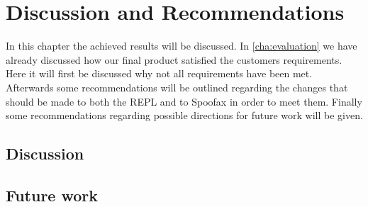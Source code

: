 \chapter{Discussion and Recommendations}
\label{cha:disc-recomm}

In this chapter the achieved results will be discussed. In \cref{cha:evaluation}
we have already discussed how our final product satisfied the customers
requirements.  Here it will first be discussed why not all requirements have
been met. Afterwards some recommendations will be outlined regarding the
changes that should be made to both the REPL and to Spoofax in order to meet
them. Finally some recommendations regarding possible directions for future
work will be given.

\section{Discussion}
\label{sec:discuss-discussion}



\section{Future work}
\label{sec:discuss-future}



